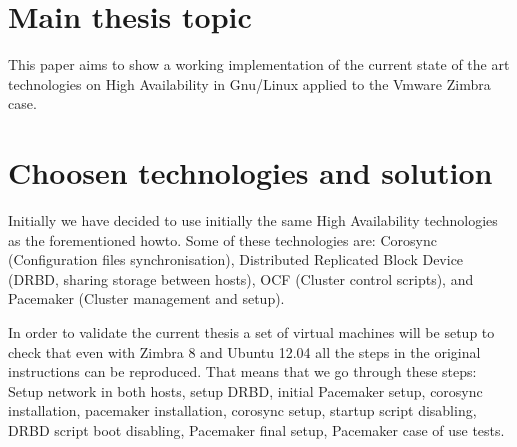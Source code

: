 \section {Main thesis topic}
This paper aims to show a working implementation of the current state of the art technologies on High Availability in Gnu/Linux applied to the Vmware Zimbra case.

\section {Choosen technologies and solution}
Initially we have decided to use initially the same High Availability technologies as the forementioned howto. Some of these technologies are: Corosync (Configuration files synchronisation), Distributed Replicated Block Device (DRBD, sharing storage between hosts), OCF (Cluster control scripts), and Pacemaker (Cluster management and setup).

In order to validate the current thesis a set of virtual machines will be setup to check that even with Zimbra 8 and Ubuntu 12.04 all the steps in the original instructions can be reproduced. That means that we go through these steps: Setup network in both hosts, setup DRBD, initial Pacemaker setup, corosync installation, pacemaker installation, corosync setup, startup script disabling, DRBD script boot disabling, Pacemaker final setup, Pacemaker case of use tests.

